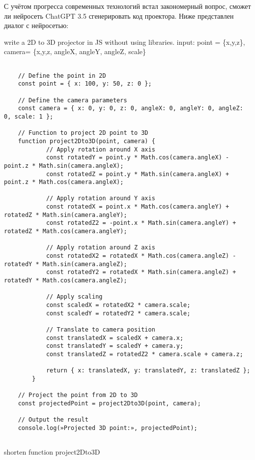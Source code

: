 С учётом прогресса современных технологий встал закономерный вопрос, сможет ли нейросеть ChatGPT 3.5 сгенерировать код проектора. Ниже представлен диалог с нейросетью:

\begin{leftBox}
	write a 2D to 3D projector in JS without using libraries. input:  point = \{x,y,z\}, camera= \{x,y,z, angleX, angleY, angleZ, scale\}
\end{leftBox}

\begin{lstlisting}[numbers=none]
	
	// Define the point in 2D
	const point = { x: 100, y: 50, z: 0 };

	// Define the camera parameters
	const camera = { x: 0, y: 0, z: 0, angleX: 0, angleY: 0, angleZ: 0, scale: 1 };

	// Function to project 2D point to 3D
	function project2Dto3D(point, camera) {
			// Apply rotation around X axis
			const rotatedY = point.y * Math.cos(camera.angleX) - point.z * Math.sin(camera.angleX);
			const rotatedZ = point.y * Math.sin(camera.angleX) + point.z * Math.cos(camera.angleX);

			// Apply rotation around Y axis
			const rotatedX = point.x * Math.cos(camera.angleY) + rotatedZ * Math.sin(camera.angleY);
			const rotatedZ2 = -point.x * Math.sin(camera.angleY) + rotatedZ * Math.cos(camera.angleY);

			// Apply rotation around Z axis
			const rotatedX2 = rotatedX * Math.cos(camera.angleZ) - rotatedY * Math.sin(camera.angleZ);
			const rotatedY2 = rotatedX * Math.sin(camera.angleZ) + rotatedY * Math.cos(camera.angleZ);

			// Apply scaling
			const scaledX = rotatedX2 * camera.scale;
			const scaledY = rotatedY2 * camera.scale;

			// Translate to camera position
			const translatedX = scaledX + camera.x;
			const translatedY = scaledY + camera.y;
			const translatedZ = rotatedZ2 * camera.scale + camera.z;

			return { x: translatedX, y: translatedY, z: translatedZ };
		}

	// Project the point from 2D to 3D
	const projectedPoint = project2Dto3D(point, camera);

	// Output the result
	console.log(»Projected 3D point:», projectedPoint);
	
\end{lstlisting}

\begin{leftBox}
	shorten function project2Dto3D
\end{leftBox}

